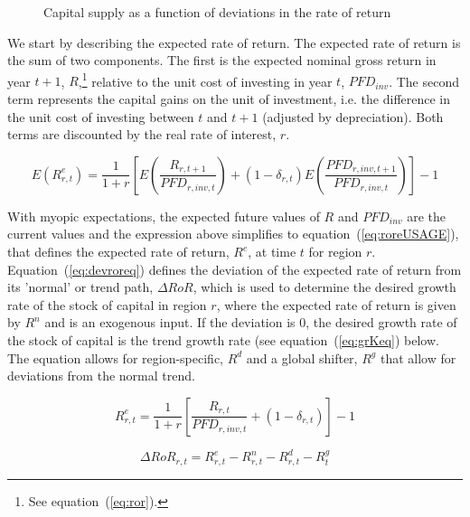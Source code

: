 \documentclass[11pt,letterpaper]{report}
\begin{document}
\begin{figure}
   \centering
   
   \caption{Capital supply as a function of deviations in the rate of return}
   \label{fig:grKCurve}
\end{figure}

We start by describing the expected rate of return. The expected rate of return
is the sum of two components. The first is the expected nominal gross return in
year $t+1$, $R$,\footnote{See equation~(\ref{eq:ror}).} relative to the unit
cost of investing in year $t$, $\mathit{PFD}_{\mathit{inv}}$. The second term
represents the capital gains on the unit of investment, i.e. the difference in
the unit cost of investing between $t$ and $t+1$ (adjusted by depreciation).
Both terms are discounted by the real rate of interest, $r$.

\[
E\left(R^e_{r,t}\right) =
   \frac {1} {1+r}
   \left[
      E\left(\frac{\mathit{R}_{r,t+1}}{\mathit{PFD}_{r,\mathit{inv},t}}\right)
      + \left(1-\delta_{r,t}\right)
         E\left(\frac{\mathit{PFD}_{r,\mathit{inv},t+1}}
            {\mathit{PFD}_{r,\mathit{inv},t}}\right)
   \right]-1
\]

\noindent With myopic expectations, the expected future values of $R$ and
$\mathit{PFD}_{\mathit{inv}}$ are the current values and the expression above
simplifies to equation~(\ref{eq:roreUSAGE}), that defines the expected rate of
return, $\mathit{R}^e$, at time $t$ for region $r$. Equation~(\ref{eq:devroreq})
defines the deviation of the expected rate of return from its 'normal' or trend
path, $\mathit{\Delta{RoR}}$, which is used to determine the desired growth rate
of the stock of capital in region $r$, where the expected rate of return is
given by $R^n$ and is an exogenous input. If the deviation is 0, the desired
growth rate of the stock of capital is the trend growth rate
(see equation~(\ref{eq:grKeq}) below. The equation allows for region-specific,
$R^d$ and a global shifter, $R^g$ that allow for deviations from the normal
trend.

\begin{equation}
\label{eq:roreUSAGE}
\mathit{R}_{r,t}^e =
   \frac{1}{1+r}
   \left[
      \frac{\mathit{R}_{r,t}}{\mathit{PFD}_{r,\mathit{inv},t}}
      +  \left(1-\delta_{r,t}\right)
   \right] - 1
\end{equation}

\begin{equation}
\label{eq:devroreq}
\mathit{\Delta{RoR}}_{r,t} =
   \mathit{R}_{r,t}^e - \mathit{R}_{r,t}^n
      - \mathit{R}_{r,t}^d - \mathit{R}_{t}^g
\end{equation}
\end{document}
